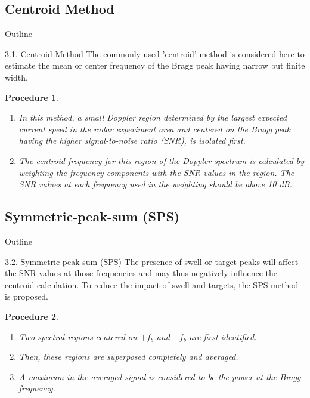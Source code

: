 \documentclass[12pt]{beamer}
\newtheorem{procedure}{Procedure}
\begin{document}
\subsection{Centroid Method}
\begin{frame}{Outline}
  \transfade%
  \tableofcontents[sectionstyle=show/shaded,subsectionstyle=show/shaded] %
\end{frame}
\begin{frame}{3.1. Centroid Method}
  The commonly used 'centroid' method is considered
here to estimate the {\color{red} mean or center frequency}
of the Bragg peak having narrow but finite width. \pause
\begin{procedure}
  \begin{enumerate}
  \item In this method, a small Doppler region determined
by the largest expected current speed in the radar
experiment area and centered on the Bragg peak
having the higher signal-to-noise ratio (SNR), is
isolated first.
    \item The centroid frequency for this region
of the Doppler spectrum is calculated by weighting
the frequency components with the SNR values in
the region. The SNR values at each frequency used
in the weighting should be above 10 dB.
\end{enumerate}
\end{procedure}
\end{frame}

\subsection{Symmetric-peak-sum (SPS)}
\begin{frame}{Outline}
  \transfade%
  \tableofcontents[sectionstyle=show/shaded,subsectionstyle=show/shaded] %
\end{frame}
\begin{frame}{3.2. Symmetric-peak-sum (SPS)}
  The presence of swell or target peaks will affect the SNR values at those frequencies and may thus negatively influence the centroid calculation. To reduce the impact of swell and targets, the SPS method is proposed.  \pause
  \begin{procedure}
    \begin{enumerate}
      \item Two spectral regions centered on $+f_b$ and $-f_b$ are first identified. 
      \item Then, these regions are superposed completely and averaged.
      \item A maximum in the averaged signal is considered to be the power at the Bragg frequency.
    \end{enumerate}
  \end{procedure}
\end{frame}
\end{document}

